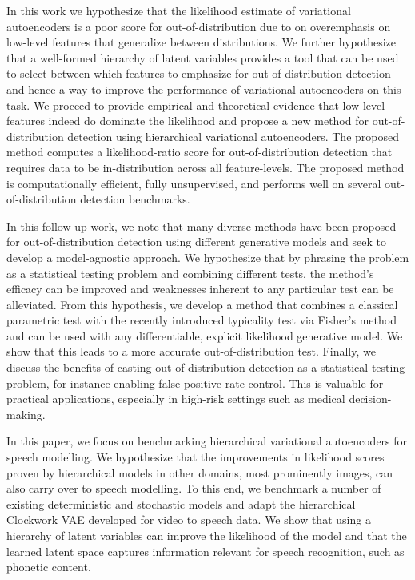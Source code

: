 In this work we hypothesize that the likelihood estimate of variational autoencoders is a poor score for out-of-distribution due to on overemphasis on low-level features that generalize between distributions. 
We further hypothesize that a well-formed hierarchy of latent variables provides a tool that can be used to select between which features to emphasize for out-of-distribution detection and hence a way to improve the performance of variational autoencoders on this task. 
We proceed to provide empirical and theoretical evidence that low-level features indeed do dominate the likelihood and propose a new method for out-of-distribution detection using hierarchical variational autoencoders. 
The proposed method computes a likelihood-ratio score for out-of-distribution detection that requires data to be in-distribution across all feature-levels. 
The proposed method is computationally efficient, fully unsupervised, and performs well on several out-of-distribution detection benchmarks. 

In this follow-up work, we note that many diverse methods have been proposed for out-of-distribution detection using different generative models and seek to develop a model-agnostic approach. 
We hypothesize that by phrasing the problem as a statistical testing problem and combining different tests, the method's efficacy can be improved and weaknesses inherent to any particular test can be alleviated. 
From this hypothesis, we develop a method that combines a classical parametric test with the recently introduced typicality test via Fisher's method and can be used with any differentiable, explicit likelihood generative model.
We show that this leads to a more accurate out-of-distribution test. 
Finally, we discuss the benefits of casting out-of-distribution detection as a statistical testing problem, for instance enabling false positive rate control. This is valuable for practical applications, especially in high-risk settings such as medical decision-making.


In this paper, we focus on benchmarking hierarchical variational autoencoders for speech modelling. 
We hypothesize that the improvements in likelihood scores proven by hierarchical models in other domains, most prominently images, can also carry over to speech modelling. 
To this end, we benchmark a number of existing deterministic and stochastic models and adapt the hierarchical Clockwork VAE developed for video \parencite{saxena_clockwork_2021} to speech data. 
We show that using a hierarchy of latent variables can improve the likelihood of the model and that the learned latent space captures information relevant for speech recognition, such as phonetic content. 


